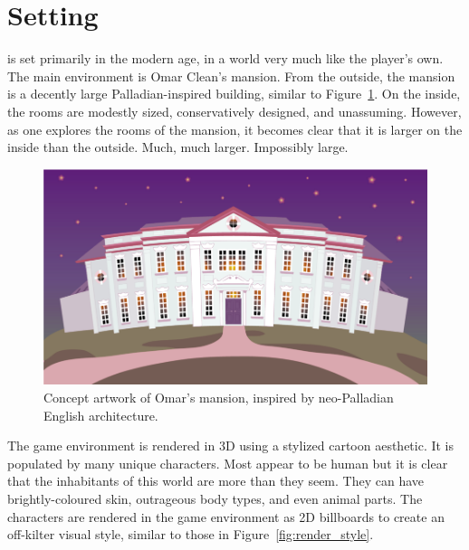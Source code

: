 \section{Setting}
\ourgame{} is set primarily in the modern age, in a world very much like the player's own. The main environment is Omar Clean's mansion. From the outside, the mansion is a decently large Palladian-inspired building, similar to Figure~\ref{fig:mansion_photo}. On the inside, the rooms are modestly sized, conservatively designed, and unassuming. However, as one explores the rooms of the mansion, it becomes clear that it is larger on the inside than the outside. Much, much larger. Impossibly large.

\begin{figure}[htb]
\centering\includegraphics[width=.4\linewidth]{images/mansion2}
\caption{Concept artwork of Omar's mansion, inspired by neo-Palladian English architecture.}
\label{fig:mansion_photo}
\end{figure}

The game environment is rendered in 3D using a stylized cartoon aesthetic. It is populated by many unique characters. Most appear to be human but it is clear that the inhabitants of this world are more than they seem. They can have brightly-coloured skin, outrageous body types, and even animal parts. The characters are rendered in the game environment as 2D billboards to create an off-kilter visual style, similar to those in Figure~\ref{fig:render_style}.


